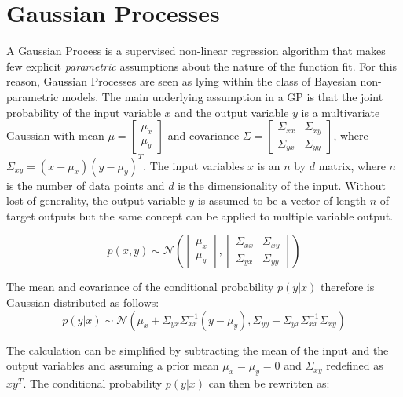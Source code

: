 \documentclass[a4paper,12pt]{article}
\begin{document}
\section{Gaussian Processes}
\label{sec-gaussian-process}

A Gaussian Process is a supervised non-linear regression algorithm that makes few explicit \emph{parametric} assumptions about the nature of the function fit. For this reason, Gaussian Processes are seen as lying within the class of Bayesian non-parametric models. The main underlying assumption in a GP is that the joint probability of the input variable $x$ and the output variable $y$ is a multivariate Gaussian with mean $\mu=\begin{bmatrix} \mu_{x}\\ \mu_{y}\end{bmatrix}$ and covariance $\Sigma=\begin{bmatrix}\Sigma_{xx} & \Sigma_{xy}\\\Sigma_{yx} & \Sigma_{yy} \end{bmatrix}$, where $\Sigma_{xy}=(x-\mu_{x})(y-\mu_{y})^{T}$. The input variables $x$ is an $n$ by $d$ matrix, where $n$ is the number of data points and $d$ is the dimensionality of the input. Without lost of generality, the output variable $y$ is assumed to be a vector of length $n$ of target outputs but the same concept can be applied to multiple variable output.

\begin{equation}
p\left ( x,y\right) \sim \mathcal{N} \left ( \begin{bmatrix}\mu_{x}\\\mu_{y} \end{bmatrix}, \begin{bmatrix}\Sigma_{xx} & \Sigma_{xy}\\\Sigma_{yx} & \Sigma_{yy} \end{bmatrix}\right )
\end{equation}

The mean and covariance of the conditional probability $p(y|x)$ therefore is Gaussian distributed as follows:
\begin{equation}
p(y|x) \sim  \mathcal{N} \left ( \mu_{x}+\Sigma_{yx}\Sigma_{xx}^{-1}\left ( y-\mu_{y}\right ), \Sigma_{yy}-\Sigma_{yx}\Sigma_{xx}^{-1}\Sigma_{xy}\right )
\end{equation}

The calculation can be simplified by subtracting the mean of the input and the output variables and assuming a prior mean $\mu_{x}=\mu_{y}=0$ and $\Sigma_{xy}$ redefined as $xy^{T}$. The conditional probability $p(y|x)$ can then be rewritten as:
\end{document}
